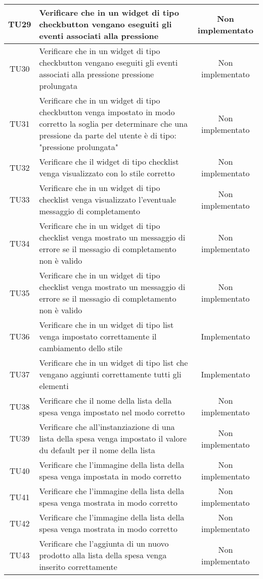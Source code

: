 \begin{center}
\begin{longtable}{|c|>{\centering}m{10cm}|c|}
		TU29 & Verificare che in un widget di tipo checkbutton vengano eseguiti gli eventi associati alla pressione & Non implementato \\ \hline
		TU30 & Verificare che in un widget di tipo checkbutton vengano eseguiti gli eventi associati alla pressione pressione prolungata & Non implementato \\ \hline
		TU31 & Verificare che in un widget di tipo checkbutton venga impostato in modo corretto la soglia per determinare che una pressione da parte del utente è di tipo: "pressione prolungata" & Non implementato \\ \hline
		TU32 & Verificare che il widget di tipo checklist venga visualizzato con lo stile corretto & Non implementato \\ \hline
		TU33 & Verificare che in un widget di tipo checklist venga visualizzato l'eventuale messaggio di completamento & Non implementato \\ \hline
		TU34 & Verificare che in un widget di tipo checklist venga mostrato un messaggio di errore se il messagio di completamento non è valido & Non implementato \\ \hline
		TU35 & Verificare che in un widget di tipo checklist venga mostrato un messaggio di errore se il messagio di completamento non è valido & Non implementato \\ \hline
		TU36 & Verificare che in un widget di tipo list venga impostato correttamente il cambiamento dello stile & Implementato \\ \hline
		TU37 & Verificare che in un widget di tipo list che vengano aggiunti correttamente tutti gli elementi & Implementato \\ \hline
		TU38 & Verificare che il nome della lista della spesa venga impostato nel modo corretto & Non implementato \\ \hline
		TU39 & Verificare che all'instanziazione di una lista della spesa venga impostato il valore du default per il nome della lista & Non implementato \\ \hline
		TU40 & Verificare che l'immagine della lista della spesa venga impostata in modo corretto & Non implementato \\ \hline
		TU41 & Verificare che l'immagine della lista della spesa venga mostrata in modo corretto & Non implementato \\ \hline
		TU42 & Verificare che l'immagine della lista della spesa venga mostrata in modo corretto & Non implementato \\ \hline
		TU43 & Verificare che l'aggiunta di un nuovo prodotto alla lista della spesa venga inserito correttamente & Non implementato \\ \hline

\end{longtable}
\end{center}
